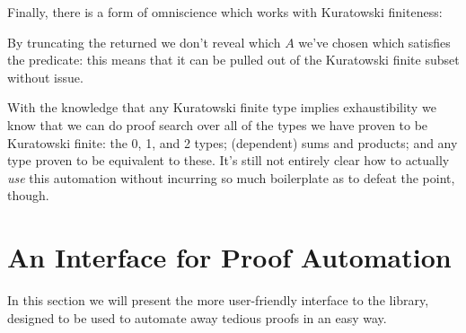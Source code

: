 Finally, there is a form of omniscience which works with Kuratowski finiteness:
\begin{agdalisting*}
\end{agdalisting*}
By truncating the returned \AgdaDatatype{\ensuremath{\Sigma}} we don't reveal
which \(A\) we've chosen which satisfies the predicate: this means that it can
be pulled out of the Kuratowski finite subset without issue.
\begin{agdalisting*}
\end{agdalisting*}

With the knowledge that any Kuratowski finite type implies exhaustibility we
know that we can do proof search over all of the types we have proven to be
Kuratowski finite: the 0, 1, and 2 types; (dependent) sums and products; and any
type proven to be equivalent to these.
It's still not entirely clear how to actually \emph{use} this automation without
incurring so much boilerplate as to defeat the point, though.
\section{An Interface for Proof Automation}
In this section we will present the more user-friendly interface to the library,
designed to be used to automate away tedious proofs in an easy way.

